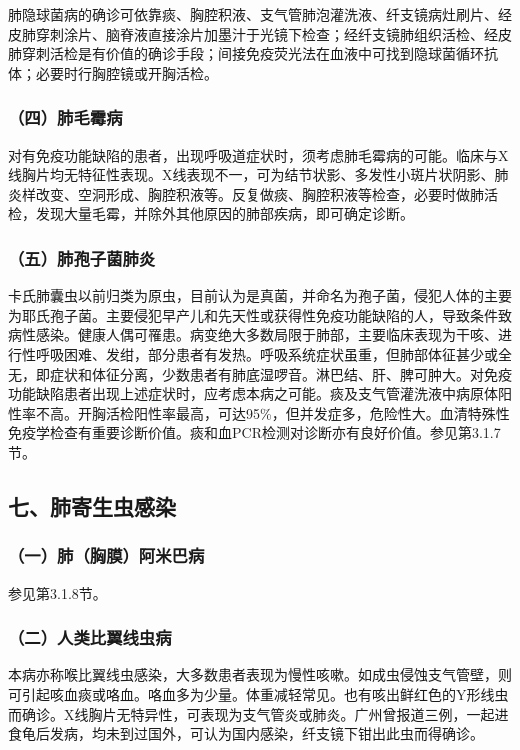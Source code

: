 肺隐球菌病的确诊可依靠痰、胸腔积液、支气管肺泡灌洗液、纤支镜病灶刷片、经皮肺穿刺涂片、脑脊液直接涂片加墨汁于光镜下检查；经纤支镜肺组织活检、经皮肺穿刺活检是有价值的确诊手段；间接免疫荧光法在血液中可找到隐球菌循环抗体；必要时行胸腔镜或开胸活检。

\subsubsection{（四）肺毛霉病}

对有免疫功能缺陷的患者，出现呼吸道症状时，须考虑肺毛霉病的可能。临床与X线胸片均无特征性表现。X线表现不一，可为结节状影、多发性小斑片状阴影、肺炎样改变、空洞形成、胸腔积液等。反复做痰、胸腔积液等检查，必要时做肺活检，发现大量毛霉，并除外其他原因的肺部疾病，即可确定诊断。

\subsubsection{（五）肺孢子菌肺炎}

卡氏肺囊虫以前归类为原虫，目前认为是真菌，并命名为孢子菌，侵犯人体的主要为耶氏孢子菌。主要侵犯早产儿和先天性或获得性免疫功能缺陷的人，导致条件致病性感染。健康人偶可罹患。病变绝大多数局限于肺部，主要临床表现为干咳、进行性呼吸困难、发绀，部分患者有发热。呼吸系统症状虽重，但肺部体征甚少或全无，即症状和体征分离，少数患者有肺底湿啰音。淋巴结、肝、脾可肿大。对免疫功能缺陷患者出现上述症状时，应考虑本病之可能。痰及支气管灌洗液中病原体阳性率不高。开胸活检阳性率最高，可达95\%，但并发症多，危险性大。血清特殊性免疫学检查有重要诊断价值。痰和血PCR检测对诊断亦有良好价值。参见第3.1.7节。

\subsection{七、肺寄生虫感染}

\subsubsection{（一）肺（胸膜）阿米巴病}

参见第3.1.8节。

\subsubsection{（二）人类比翼线虫病}

本病亦称喉比翼线虫感染，大多数患者表现为慢性咳嗽。如成虫侵蚀支气管壁，则可引起咳血痰或咯血。咯血多为少量。体重减轻常见。也有咳出鲜红色的Y形线虫而确诊。X线胸片无特异性，可表现为支气管炎或肺炎。广州曾报道三例，一起进食龟后发病，均未到过国外，可认为国内感染，纤支镜下钳出此虫而得确诊。

